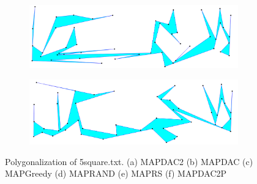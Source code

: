 \documentclass[conference]{IEEEtran}
\begin{document}
\begin{figure}[htbp]
			\begin{subfigure}{0.99\linewidth}
				\centering
				\includegraphics[width=0.99\textwidth]{fig6e.png}
				\caption{}
				\label{fig6e}
			\end{subfigure}
			
			\begin{subfigure}{0.99\linewidth}
				\centering
				\includegraphics[width=0.99\textwidth]{fig6f.png}
				\caption{}
				\label{fig6f}
			\end{subfigure}
			
			\caption
			{
				Polygonalization of 5{\textunderscore}square.txt.
				(a) MAP{\textunderscore}DAC2
				(b) MAP{\textunderscore}DAC
				(c) MAP{\textunderscore}Greedy
				(d) MAP{\textunderscore}RAND
				(e) MAP{\textunderscore}RS
				(f) MAP{\textunderscore}DAC2{\textunderscore}P
			}
			\label{fig6}
		\end{figure}
		
\end{document}
